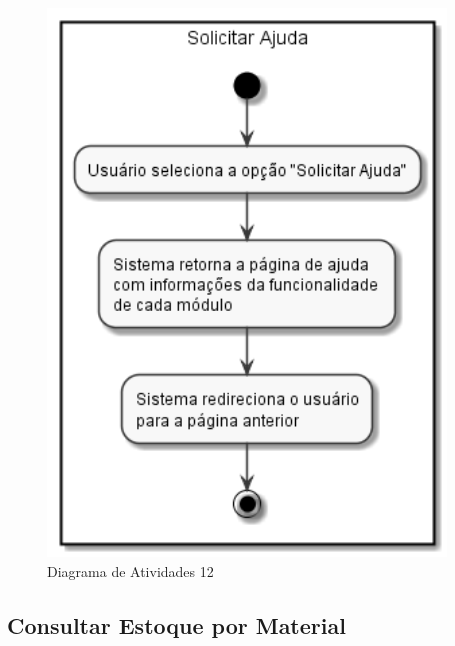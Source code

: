 \documentclass[rascunho,xindy,acronym,symbols]{fei}
\begin{document}
\begin{figure}[H]
    \centering
    \includegraphics[scale=0.6, width=300pt]{./Images/Solicitar_Ajuda.png}
    \caption{Diagrama de Atividades 12}
    \label{fig:diag_atv12}
\end{figure}

\subsection{Consultar Estoque por Material}
\end{document}
